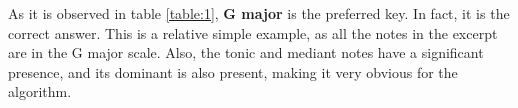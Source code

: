 As it is observed in table \ref{table:1}, \textbf{G major} is the preferred key. 
In fact, it is the correct answer.
This is a relative simple example, as all the notes in the excerpt are in the G major scale.
Also, the tonic and mediant notes have a significant presence, and its dominant is also present, making it very obvious for the algorithm.
